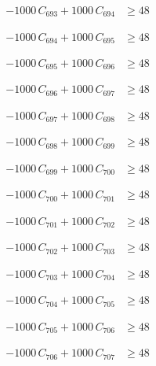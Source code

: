 \documentclass[a4paper,11pt]{article}
\begin{document}
\begin{align}
-1000\,C_{693} + 1000\,C_{694} &\geq 48 \nonumber
\end{align}

\begin{align}
-1000\,C_{694} + 1000\,C_{695} &\geq 48 \nonumber
\end{align}

\begin{align}
-1000\,C_{695} + 1000\,C_{696} &\geq 48 \nonumber
\end{align}

\begin{align}
-1000\,C_{696} + 1000\,C_{697} &\geq 48 \nonumber
\end{align}

\begin{align}
-1000\,C_{697} + 1000\,C_{698} &\geq 48 \nonumber
\end{align}

\begin{align}
-1000\,C_{698} + 1000\,C_{699} &\geq 48 \nonumber
\end{align}

\begin{align}
-1000\,C_{699} + 1000\,C_{700} &\geq 48 \nonumber
\end{align}

\begin{align}
-1000\,C_{700} + 1000\,C_{701} &\geq 48 \nonumber
\end{align}

\begin{align}
-1000\,C_{701} + 1000\,C_{702} &\geq 48 \nonumber
\end{align}

\begin{align}
-1000\,C_{702} + 1000\,C_{703} &\geq 48 \nonumber
\end{align}

\begin{align}
-1000\,C_{703} + 1000\,C_{704} &\geq 48 \nonumber
\end{align}

\begin{align}
-1000\,C_{704} + 1000\,C_{705} &\geq 48 \nonumber
\end{align}

\begin{align}
-1000\,C_{705} + 1000\,C_{706} &\geq 48 \nonumber
\end{align}

\begin{align}
-1000\,C_{706} + 1000\,C_{707} &\geq 48 \nonumber
\end{align}
\end{document}
